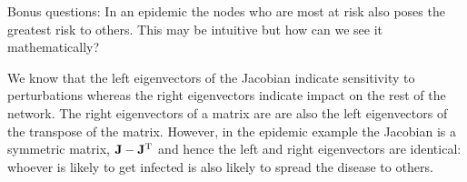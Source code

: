 \subquestion Bonus questions: In an epidemic the nodes who are most at risk also poses the greatest risk to others. This may be intuitive but how can we see it mathematically? 

\solution 
We know that the left eigenvectors of the Jacobian indicate sensitivity to perturbations whereas the right eigenvectors indicate impact on the rest of the network. The right eigenvectors of a matrix are are also the left eigenvectors of the transpose of the matrix. However, in the epidemic example the Jacobian is a symmetric matrix, ${\bf J}-{\bf J}^{\rm T}$ and hence the left and right eigenvectors are identical: whoever is likely to get infected is also likely to spread the disease to others. 
